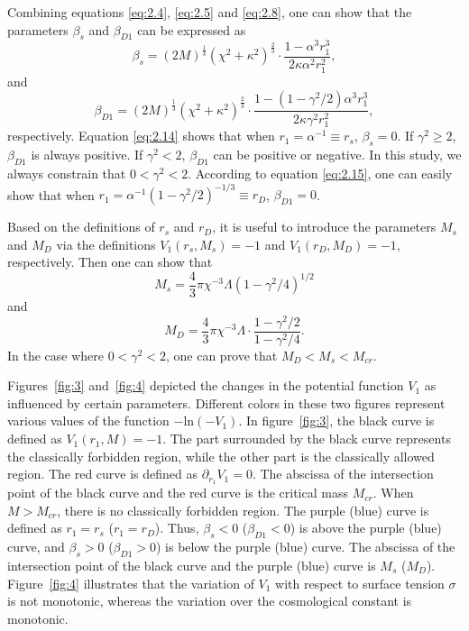 \documentclass[12pt]{article}
\begin{document}
Combining equations \eqref{eq:2.4}, \eqref{eq:2.5} and \eqref{eq:2.8}, one can show that the parameters $\beta_{s}$ and $\beta_{D1}$ can be expressed as~\cite{SEA}
\begin{equation}
\label{eq:2.14}%
\beta_{s}=(2M)^{\frac{1}{3}}(\chi^{2}+\kappa^{2})^{\frac{2}{3}}\cdot\frac{1-\alpha^{3}r_{1}^{3}}{2\kappa\alpha^{2}r_{1}^{2}},
\end{equation}
and
\begin{equation}
\label{eq:2.15}%
\beta_{D1}=(2M)^{\frac{1}{3}}(\chi^{2}+\kappa^{2})^{\frac{2}{3}}\cdot\frac{1-(1-\gamma^{2}/2)\alpha^{3}r_{1}^{3}}{2\kappa\gamma^{2}r_{1}^{2}},
\end{equation}
respectively. Equation \eqref{eq:2.14} shows that when $r_{1}=\alpha^{-1}\equiv r_{s}$, $\beta_{s}=0$. If $\gamma^{2}\geq 2$, $\beta_{D1}$ is always positive. If $\gamma^{2}<2$, $\beta_{D1}$ can be positive or negative.  In this study, we always constrain that $0<\gamma^{2}<2$. According to equation \eqref{eq:2.15}, one can easily show that when $r_{1}=\alpha^{-1}(1-\gamma^{2}/2)^{-1/3}\equiv r_{D}$, $\beta_{D1}=0$.

Based on the definitions of $r_{s}$ and $r_{D}$, it is useful to introduce the parameters $M_{s}$ and $M_{D}$ via the definitions  $V_{1}(r_{s}, M_{s})=-1$ and $V_{1}(r_{D}, M_{D})=-1$, respectively. Then one can  show that~\cite{SEA}
\begin{equation}
\label{eq:2.16}%
M_{s}=\frac{4}{3}\pi\chi^{-3}\Lambda(1-\gamma^{2}/4)^{1/2}
\end{equation}
and
\begin{equation}
\label{eq:2.17}%
M_{D}=\frac{4}{3}\pi\chi^{-3}\Lambda\cdot\frac{1-\gamma^{2}/2}{1-\gamma^{2}/4}.
\end{equation}
In the case where $0<\gamma^{2}<2$, one can prove that $M_{D}<M_{s}<M_{cr}$.

Figures~\ref{fig:3} and~\ref{fig:4} depicted the changes in the potential function $V_{1}$ as influenced by certain parameters. Different colors in these two figures represent various values of the function $-\mathrm{ln}(-V_{1})$.  In figure~\ref{fig:3}, the black curve is defined as $V_{1}(r_{1},M)=-1$. The part surrounded by the black curve represents the classically forbidden region, while the other part is the classically allowed region. The red curve is defined as $\partial_{r_{1}}V_{1}=0$. The abscissa of the intersection point of the black curve and the red curve is the critical mass $M_{cr}$.  When $M>M_{cr}$, there is no classically forbidden region. The purple (blue) curve is defined as $r_{1}=r_{s}$ ($r_{1}=r_{D}$). Thus, $\beta_{s}<0$ ($\beta_{D1}<0$) is above the purple (blue) curve, and $\beta_{s}>0$ ($\beta_{D1}>0$) is below the purple (blue) curve. The abscissa of the intersection point of the black curve and the purple (blue) curve is $M_{s}$ ($M_{D}$).  Figure~\ref{fig:4} illustrates that the variation of $V_{1}$ with respect to surface tension $\sigma$ is not monotonic, whereas the variation over the cosmological constant is monotonic.
\end{document}

